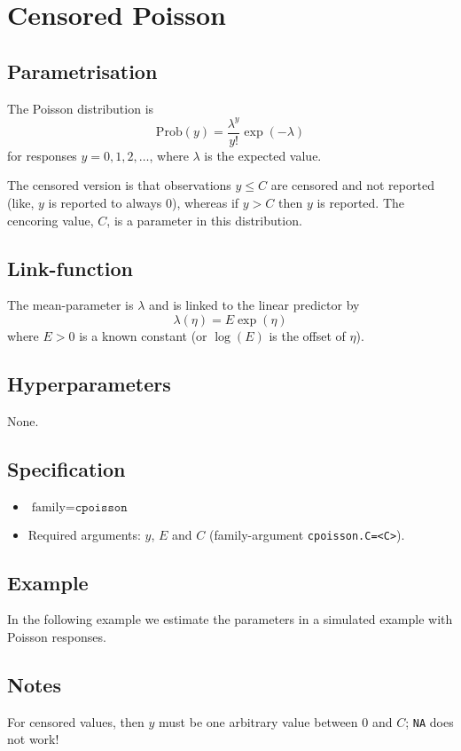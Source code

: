 \documentclass[a4paper,11pt]{article}
\begin{document}
\section*{Censored Poisson}

\subsection*{Parametrisation}

The Poisson distribution is
\begin{displaymath}
    \text{Prob}(y) = \frac{\lambda^{y}}{y!}\exp(-\lambda)
\end{displaymath}
for responses $y=0, 1, 2, \ldots$, where $\lambda$ is the expected
value.

The censored version is that observations $y \le C$ are censored and
not reported (like, $y$ is reported to always $0$), whereas if $y > C$
then $y$ is reported. The cencoring value, $C$, is a parameter in this
distribution.


\subsection*{Link-function}

The mean-parameter is $\lambda$ and is linked to the linear predictor
by
\begin{displaymath}
    \lambda(\eta) = E \exp(\eta)
\end{displaymath}
where $E>0$ is a known constant (or $\log(E)$ is the offset of $\eta$).

\subsection*{Hyperparameters}

None.

\subsection*{Specification}

\begin{itemize}
\item $\text{family}=\texttt{cpoisson}$
\item Required arguments: $y$, $E$ and $C$ (family-argument \texttt{cpoisson.C=<C>}).
\end{itemize}

\subsection*{Example}

In the following example we estimate the parameters in a simulated
example with Poisson responses.
{\small

}

\subsection*{Notes}

For censored values, then $y$ must be one arbitrary value between $0$
and $C$; \texttt{NA} does not work!
\end{document}
